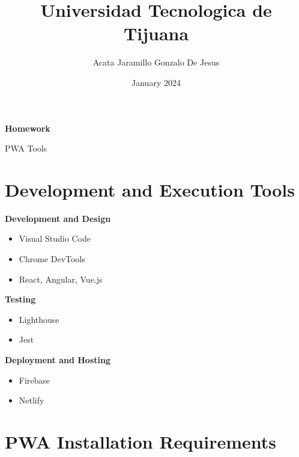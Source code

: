 \documentclass{report}
\title{Universidad Tecnologica de Tijuana}
\author{Acata Jaramillo Gonzalo De Jesus}
\date{January 2024}
\begin{document}
\maketitle

\begin{center}
    \textbf{Homework}
\end{center}

\begin{center}
    PWA Tools
\end{center}

\section{Development and Execution Tools}
\textbf{Development and Design}
\begin{itemize}
\item Visual Studio Code
\item Chrome DevTools
\item React, Angular, Vue.js
\end{itemize}

\vspace{12pt}

\textbf{Testing}
\begin{itemize}
\item Lighthouse
\item Jest
\end{itemize}

\vspace{12pt}

\textbf{Deployment and Hosting}
\begin{itemize}
\item Firebase
\item Netlify
\end{itemize}


\section{PWA Installation Requirements}
\end{document}
